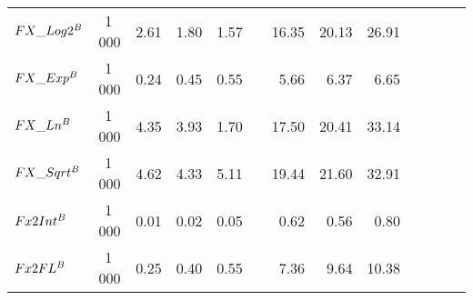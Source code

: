 \begin{table}
{\begin{tabular}{ l c c r r r r r r r r r r}
            $FX\_Log2^{B}$                         & 1\,000  & 2.61                    & 1.80       & 1.57                    &  & 16.35       & 20.13       & 26.91       \\
            $FX\_Exp^{B}$                          & 1\,000  & 0.24                    & 0.45       & 0.55                    &  & 5.66        & 6.37        & 6.65        \\
            $FX\_Ln^{B}$                           & 1\,000  & 4.35                    & 3.93       & 1.70                    &  & 17.50       & 20.41       & 33.14       \\
            $FX\_Sqrt^{B}$                         & 1\,000  & 4.62                    & 4.33       & 5.11                    &  & 19.44       & 21.60       & 32.91       \\
            $Fx2Int^{B}$                           & 1\,000  & 0.01                    & 0.02       & 0.05                    &  & 0.62        & 0.56        & 0.80        \\
            $Fx2FL^{B}$                            & 1\,000  & 0.25                    & 0.40       & 0.55                    &  & 7.36        & 9.64        & 10.38       \\
            \bottomrule
        \end{tabular}
    }
\end{table}
\FloatBarrier



